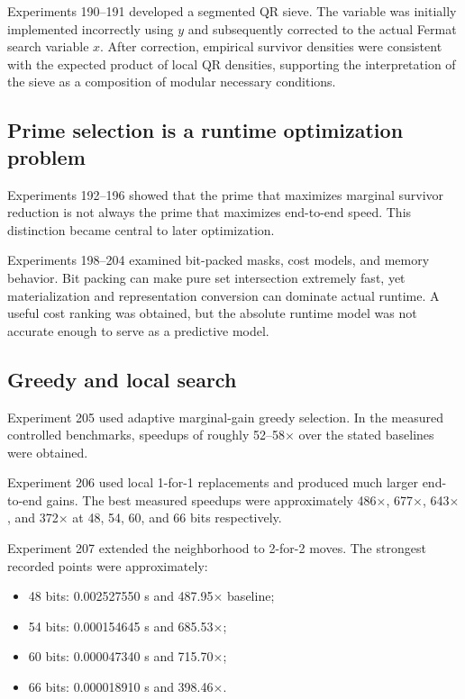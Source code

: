 \documentclass[11pt,a4paper]{article}
\begin{document}
Experiments 190--191 developed a segmented QR sieve. The variable was initially implemented incorrectly using $y$ and subsequently corrected to the actual Fermat search variable $x$. After correction, empirical survivor densities were consistent with the expected product of local QR densities, supporting the interpretation of the sieve as a composition of modular necessary conditions.

\subsection{Prime selection is a runtime optimization problem}

Experiments 192--196 showed that the prime that maximizes marginal survivor reduction is not always the prime that maximizes end-to-end speed. This distinction became central to later optimization.

Experiments 198--204 examined bit-packed masks, cost models, and memory behavior. Bit packing can make pure set intersection extremely fast, yet materialization and representation conversion can dominate actual runtime. A useful cost ranking was obtained, but the absolute runtime model was not accurate enough to serve as a predictive model.

\subsection{Greedy and local search}

Experiment 205 used adaptive marginal-gain greedy selection. In the measured controlled benchmarks, speedups of roughly 52--58$\times$ over the stated baselines were obtained.

Experiment 206 used local 1-for-1 replacements and produced much larger end-to-end gains. The best measured speedups were approximately 486$\times$, 677$\times$, 643$\times$, and 372$\times$ at 48, 54, 60, and 66 bits respectively.

Experiment 207 extended the neighborhood to 2-for-2 moves. The strongest recorded points were approximately:
\begin{itemize}[leftmargin=2em]
\item 48 bits: 0.002527550 s and 487.95$\times$ baseline;
\item 54 bits: 0.000154645 s and 685.53$\times$;
\item 60 bits: 0.000047340 s and 715.70$\times$;
\item 66 bits: 0.000018910 s and 398.46$\times$.
\end{itemize}
\end{document}

